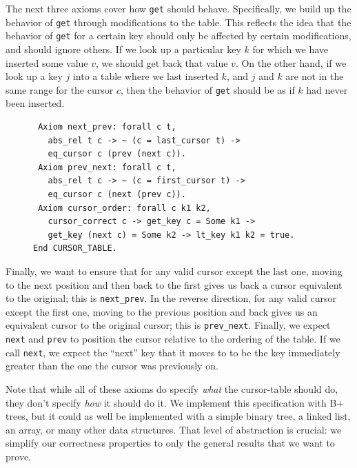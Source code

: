 \documentclass[a4paper,12pt]{article}
\begin{document}
The next three axioms cover how \texttt{get} should behave. Specifically, we build up the behavior of \texttt{get} through modifications to the table. This reflects the idea that the behavior of \texttt{get} for a certain key should only be affected by certain modifications, and should ignore others. If we look up a particular key $k$ for which we have inserted some value $v$, we should get back that value $v$. On the other hand, if we look up a key $j$ into a table where we last inserted $k$, and $j$ and $k$ are not in the same range for the cursor $c$, then the behavior of \texttt{get} should be as if $k$ had never been inserted.

\begin{figure}[h]
\begin{singlespace}
\begin{verbatim}
 Axiom next_prev: forall c t,
   abs_rel t c -> ~ (c = last_cursor t) ->
   eq_cursor c (prev (next c)).
 Axiom prev_next: forall c t,
   abs_rel t c -> ~ (c = first_cursor t) ->
   eq_cursor c (next (prev c)).
 Axiom cursor_order: forall c k1 k2,
   cursor_correct c -> get_key c = Some k1 ->
   get_key (next c) = Some k2 -> lt_key k1 k2 = true.
End CURSOR_TABLE.
\end{verbatim}
\end{singlespace}
\end{figure}

Finally, we want to ensure that for any valid cursor except the last one, moving to the next position and then back to the first gives us back a cursor equivalent to the original; this is \texttt{next\_prev}. In the reverse direction, for any valid cursor except the first one, moving to the previous position and back gives us an equivalent cursor to the original cursor; this is \texttt{prev\_next}. Finally, we expect \texttt{next} and \texttt{prev} to position the cursor relative to the ordering of the table. If we call \texttt{next}, we expect the “next” key that it moves to to be the key immediately greater than the one the cursor was previously on.

Note that while all of these axioms do specify \textit{what} the cursor-table should do, they don’t specify \textit{how} it should do it. We implement this specification with B+\,trees, but it could as well be implemented with a simple binary tree, a linked list, an array, or many other data structures. That level of abstraction is crucial: we simplify our correctness properties to only the general results that we want to prove.
\end{document}
